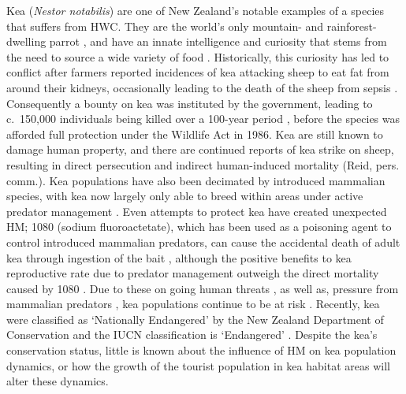 \documentclass[11pt,]{article}
\begin{document}
Kea (\emph{Nestor notabilis}) are one of New Zealand's notable examples
of a species that suffers from HWC. They are the world's only mountain-
and rainforest-dwelling parrot \citep{greer2015}, and have an innate
intelligence and curiosity that stems from the need to source a wide
variety of food \citep{diamond1999, auersperg2011}. Historically, this
curiosity has led to conflict after farmers reported incidences of kea
attacking sheep to eat fat from around their kidneys, occasionally
leading to the death of the sheep from sepsis \citep{orrWalker2009}.
Consequently a bounty on kea was instituted by the government, leading
to c.~150,000 individuals being killed over a 100-year period
\citep{temple1996}, before the species was afforded full protection
under the Wildlife Act in 1986. Kea are still known to damage human
property, and there are continued reports of kea strike on sheep,
resulting in direct persecution and indirect human-induced mortality
(Reid, pers. comm.). Kea populations have also been decimated by
introduced mammalian species, with kea now largely only able to breed
within areas under active predator management \citep{kemp2018}. Even
attempts to protect kea have created unexpected HM; 1080 (sodium
fluoroactetate), which has been used as a poisoning agent to control
introduced mammalian predators, can cause the accidental death of adult
kea through ingestion of the bait \citep{orr2012}, although the positive
benefits to kea reproductive rate due to predator management outweigh
the direct mortality caused by 1080 \citep{kemp2018}. Due to these on
going human threats \citep{gartrell2007}, as well as, pressure from
mammalian predators \citep{kemp2018}, kea populations continue to be at
risk \citep{elliott2004}. Recently, kea were classified as `Nationally
Endangered' by the New Zealand Department of Conservation and the IUCN
classification is `Endangered' \citep{IUCN2020}. Despite the kea's
conservation status, little is known about the influence of HM on kea
population dynamics, or how the growth of the tourist population in kea
habitat areas will alter these dynamics.
\end{document}
